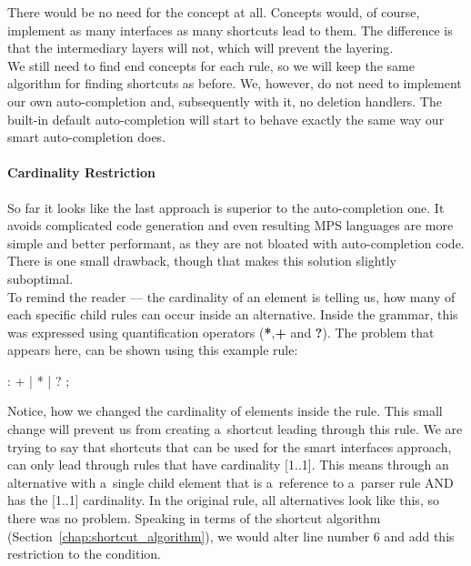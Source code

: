 There would be no need for the  concept at all.
Concepts would, of course, implement as many interfaces as many shortcuts lead to them.
The difference is that the intermediary layers will not, which will prevent the layering.
\\

We still need to find end concepts for each rule, so we will keep the same algorithm for finding shortcuts as before.
We, however, do not need to implement our own auto-completion and, subsequently with it, no deletion handlers.
The built-in default auto-completion will start to behave exactly the same way our smart auto-completion does.

\paragraph{Cardinality Restriction}
\label{chap:cardinality_restriction}

So far it looks like the last approach is superior to the auto-completion one.
It avoids complicated code generation and even resulting MPS languages are more simple and better performant, as they are not bloated with auto-completion code.
There is one small drawback, though that makes this solution slightly suboptimal.
\\

To remind the reader --- the cardinality of an element is telling us, how many of each specific child rules can occur inside an alternative.
Inside the grammar, this was expressed using quantification operators (\textbf{*},\textbf{+} and \textbf{?}).
The problem that appears here, can be shown using this example rule:

\begin{antlr}
      :   +
             |   *
             |   ?
             ;
\end{antlr}

Notice, how we changed the cardinality of elements inside the  rule.
This small change will prevent us from creating a~shortcut leading through this rule.
We are trying to say that shortcuts that can be used for the smart interfaces approach, can only lead through rules that have cardinality [1..1].
This means through an alternative with a~single child element that is a~reference to a~parser rule AND has the [1..1] cardinality.
In the original  rule, all alternatives look like this, so there was no problem.
Speaking in terms of the shortcut algorithm (Section~\ref{chap:shortcut_algorithm}), we would alter line number 6 and add this restriction to the condition.
\\

